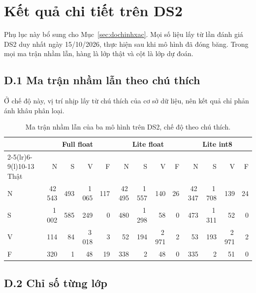 \chapter{Kết quả chi tiết trên DS2}\label{pl:ds2}

Phụ lục này bổ sung cho Mục~\ref{sec:dochinhxac}.
Mọi số liệu lấy từ lần đánh giá DS2 duy nhất ngày 15/10/2026, thực hiện sau khi mô hình đã đóng băng.
Trong mọi ma trận nhầm lẫn, hàng là lớp thật và cột là lớp dự đoán.

\section*{D.1 Ma trận nhầm lẫn theo chú thích}

Ở chế độ này, vị trí nhịp lấy từ chú thích của cơ sở dữ liệu, nên kết quả chỉ phản ánh khâu phân loại.
\begin{table}[htbp]\centering
\caption{Ma trận nhầm lẫn của ba mô hình trên DS2, chế độ theo chú thích.}\label{tab:pld-cm}
\small\setlength{\tabcolsep}{4pt}\begin{tabular}{@{}lrrrrrrrrrrrr@{}}\toprule
 & \multicolumn{4}{c}{Full float} & \multicolumn{4}{c}{Lite float} & \multicolumn{4}{c}{Lite int8} \\
\cmidrule(lr){2-5}\cmidrule(lr){6-9}\cmidrule(l){10-13}
Thật & N & S & V & F & N & S & V & F & N & S & V & F \\ \midrule
N & 42\,543 & 493 & 1\,065 & 117 & 42\,495 & 1\,557 & 140 & 26 & 42\,347 & 1\,708 & 139 & 24 \\
S & 1\,002 & 585 & 249 & 0 & 480 & 1\,298 & 58 & 0 & 473 & 1\,311 & 52 & 0 \\
V & 114 & 84 & 3\,018 & 3 & 52 & 194 & 2\,971 & 2 & 53 & 193 & 2\,971 & 2 \\
F & 320 & 1 & 48 & 19 & 338 & 2 & 48 & 0 & 335 & 2 & 51 & 0 \\
\bottomrule\end{tabular}\end{table}

\section*{D.2 Chỉ số từng lớp}

